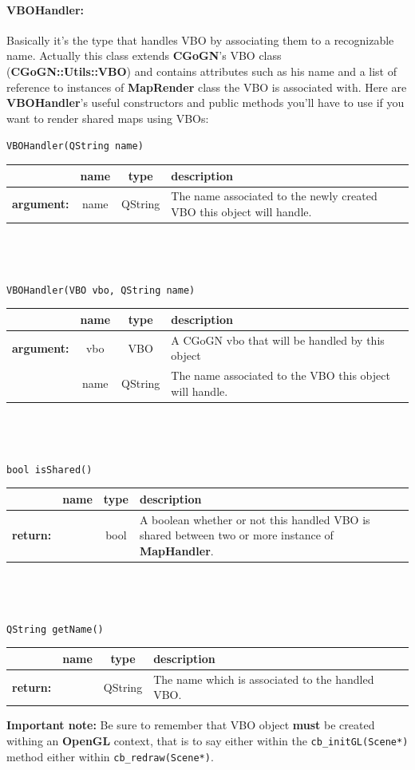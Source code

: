\documentclass[a4paper]{scrreprt}
\begin{document}
	\paragraph{VBOHandler:}
	Basically it's the type that handles VBO by associating them to a recognizable
	name. Actually this class extends \textbf{CGoGN}'s VBO class
	(\textbf{CGoGN::Utils::VBO}) and contains attributes such as his name and a
	list of reference to instances of \textbf{MapRender} class the VBO is
	associated with. Here are \textbf{VBOHandler}'s useful constructors and public
	methods you'll have to use if you want to render shared maps using VBOs:
	\begin{center}
		\texttt{VBOHandler(QString name)}
	\begin{tabular}{|l|c|c|p{}|}
		\hline
		~ & name & type & description
		\\ \hline
		\textbf{argument:} & name & QString &
			The name associated to the newly created VBO this object will handle.
		\\ \hline
	\end{tabular}
	\\~\\~\\
		\texttt{VBOHandler(VBO vbo, QString name)}
	\begin{tabular}{|l|c|c|p{}|}
		\hline
		~ & name & type & description
		\\ \hline
		\textbf{argument:} & vbo & VBO &
			A CGoGN vbo that will be handled by this object
		\\ \cline{2-4}
		~ & name & QString &
			The name associated to the VBO this object will handle.
		\\ \hline
	\end{tabular}
	\\~\\~\\
		\texttt{bool isShared()}
	\begin{tabular}{|l|c|c|p{}|}
		\hline
		~ & name & type & description
		\\ \hline
		\textbf{return:} & ~ & bool &
			A boolean whether or not this handled VBO is shared between two or more
			instance of \textbf{MapHandler}.
		\\ \hline
	\end{tabular}
	\\~\\~\\
		\texttt{QString getName()}
	\begin{tabular}{|l|c|c|p{}|}
		\hline
		~ & name & type & description
		\\ \hline
		\textbf{return:} & ~ & QString &
			The name which is associated to the handled VBO.
		\\ \hline
	\end{tabular}
	\end{center}
	\textbf{Important note:} Be sure to remember that VBO object \textbf{must} be
	created withing an \textbf{OpenGL} context, that is to say either within the
	\texttt{cb\_initGL(Scene*)} method either within \texttt{cb\_redraw(Scene*)}.
	
\end{document}

